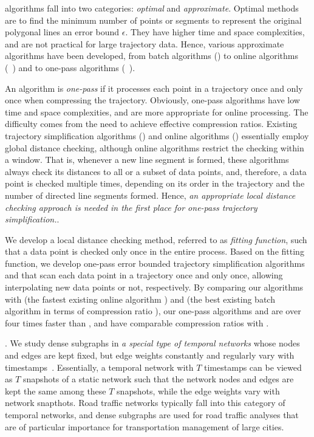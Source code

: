 \lsa algorithms fall into two categories: {\em optimal} and {\em approximate}.
Optimal methods\cite{Imai:Optimal} are to find the minimum number of points or segments to represent the original polygonal lines \wrt an error bound $\epsilon$. They have higher time and space complexities, and are not practical for large trajectory data.
Hence,  various approximate \lsa algorithms have been developed, from batch algorithms (\eg \cite{Douglas:Peucker}) to online algorithms (\eg~\cite{Liu:BQS}) and to one-pass algorithms (\eg~\cite{LinMZWH17}).


An \lsa algorithm is {\em one-pass} if it processes each point in a trajectory once and only once when compressing the trajectory.
Obviously, one-pass algorithms have low time and space complexities, and are more appropriate for online processing. The difficulty comes from the need to achieve effective compression ratios.
Existing trajectory simplification algorithms (\eg \cite{Douglas:Peucker}) and online algorithms  (\eg \cite{Liu:BQS}) essentially employ global distance checking, although online algorithms restrict the checking within a window. That is, whenever a new line segment is formed, these algorithms always check its distances to all or a subset of data points, and, therefore, a data point is checked multiple times, depending on its order in the trajectory and the number of directed line segments formed. Hence, {\em an appropriate local distance checking approach is needed in the first place for  one-pass trajectory simplification.}.

 We develop a local distance checking method, referred to as  {\em fitting function}, such that a data point is checked only once in the entire process. Based on the fitting function, we develop one-pass error bounded trajectory simplification algorithms \operb and \operba that scan each data point in a trajectory once and only once, allowing interpolating new data points or not, respectively. By comparing our algorithms with \fbqsa (the fastest existing \lsa online algorithm \cite{Liu:BQS}) and \dpa (the best existing \lsa batch algorithm in terms of compression ratio \cite{Douglas:Peucker}), our one-pass algorithms  \operb and \operba are over four times faster than \fbqsa, and have  comparable compression ratios with \dpa.


.  We study dense subgraphs in {\em a special type of temporal networks} whose nodes and edges are kept fixed, but edge weights constantly and regularly vary with timestamps~\cite{MaHWLH17}.  Essentially, a temporal network with $T$ timestamps can be viewed as $T$ snapshots of a static network such that the network nodes and edges are kept the same among these $T$ snapshots, while the edge weights vary with network snapthots. Road traffic networks typically fall into this category of temporal networks, and dense subgraphs are used for road traffic analyses that are of particular importance for transportation management of large cities.

